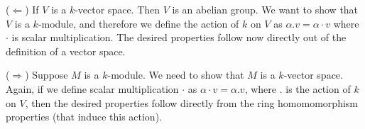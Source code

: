 ($\Leftarrow$) If $V$ is a $k$-vector space. Then $V$ is an abelian group. We want to show that $V$ is a $k$-module, and therefore we define the action of $k$ on $V$ as $\alpha.v=\alpha\cdot v$ where $\cdot$ is scalar multiplication. The desired properties follow now directly out of the definition of a vector space.

($\Rightarrow$) Suppose $M$ is a $k$-module. We need to show that $M$ is a $k$-vector space. Again, if we define scalar multiplication $\cdot$ as $\alpha \cdot v= \alpha .v$, where $.$ is the action of $k$ on $V$, then the desired properties follow directly from the ring homomomorphism properties (that induce this action).

